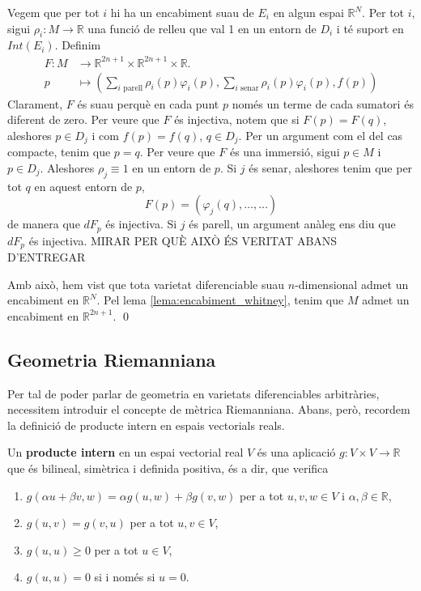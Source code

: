 {    Vegem que per tot $i$ hi ha un encabiment suau de $E_i$ en algun espai $\mathbb R^N$. Per tot $i$, sigui $\rho_i:M\to \mathbb R$ una funció de relleu que val 1 en un entorn de $D_i$ i té suport en $Int(E_i)$. Definim
    \begin{align*}
        F:M&\to\mathbb R^{2n + 1}\times\mathbb R^{2n + 1}\times\mathbb R.\\
        p&\mapsto \left(    \sum_{i\text{ parell}}    \rho_i(p)\varphi_i(p), \sum_{i\text{ senar}}    \rho_i(p)\varphi_i(p), f(p)\right)
    \end{align*}
    Clarament, $F$ és suau perquè en cada punt $p$ només un terme de cada sumatori és diferent de zero.
    Per veure que $F$ és injectiva, notem que si $F(p)=F(q)$, aleshores $p\in D_j$ i com $f(p)=f(q)$, $q\in D_j$. Per un argument com el del cas compacte, tenim que $p=q$.
    Per veure que $F$ és una immersió, sigui $p\in M$ i $p\in D_j$. Aleshores $\rho_j\equiv1$ en un entorn de $p$. Si $j$ és senar, aleshores tenim que per tot $q$ en aquest entorn de $p$, 
    \begin{equation*}
        F(p) = (\varphi_j(q),\dots,\dots)
    \end{equation*}
    de manera que $dF_p$ és injectiva. Si $j$ és parell, un argument anàleg ens diu que $dF_p$ és injectiva. {\color{blue}MIRAR PER QUÈ AIXÒ ÉS VERITAT ABANS D'ENTREGAR}

    Amb això, hem vist que tota varietat diferenciable suau $n$-dimensional admet un encabiment en $\mathbb R^{N}$. Pel lema \ref{lema:encabiment_whitney}, tenim que $M$ admet un encabiment en $\mathbb R^{2n+1}$.
    \qed
}





\subsection{Geometria Riemanniana}
Per tal de poder parlar de geometria en varietats diferenciables arbitràries, necessitem introduir el concepte de mètrica Riemanniana. Abans, però, recordem la definició de producte intern en espais vectorials reals.
\begin{defi}
    Un \textbf{producte intern} en un espai vectorial real $V$ és una aplicació $g:V\times V\to\mathbb R$ que és bilineal, simètrica i definida positiva, és a dir, que verifica
    \begin{enumerate}
        \item $g(\alpha u + \beta v, w) = \alpha g(u,w) + \beta g(v,w)$ per a tot $u,v,w\in V$ i $\alpha,\beta\in\mathbb R$,
        \item $g(u,v) = g(v,u)$ per a tot $u,v\in V$,
        \item $g(u,u)\ge0$ per a tot $u\in V$,
        \item $g(u,u) = 0$ si i només si $u = 0$.
    \end{enumerate}
\end{defi}

